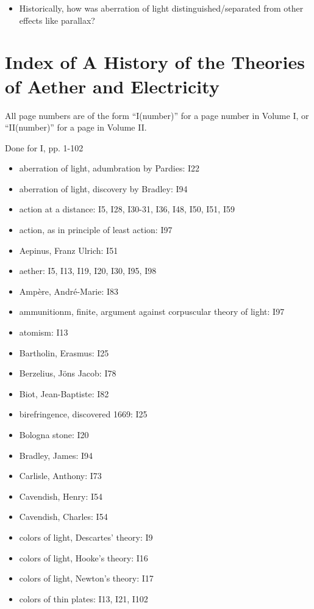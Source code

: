 \documentclass[a4paper]{article}
\theoremstyle{plain}
\theoremstyle{definition}
\begin{document}
\begin{itemize}
\item Historically, how was aberration of light
  distinguished/separated from other effects like parallax?

\end{itemize}


\section{Index of A History of the Theories of Aether and Electricity}

All page numbers are of the form ``I(number)'' for a page number in
Volume I, or ``II(number)'' for a page in Volume II.

Done for I, pp. 1-102

\begin{itemize}
\item aberration of light, adumbration by Pardies: I22
\item aberration of light, discovery by Bradley: I94
\item action at a distance: I5, I28, I30-31, I36, I48, I50, I51, I59
\item action, as in principle of least action: I97
\item Aepinus, Franz Ulrich: I51
\item aether: I5, I13, I19, I20, I30, I95, I98
\item Amp\`{e}re, Andr\'{e}-Marie: I83
\item ammunitionm, finite, argument against corpuscular theory of light: I97
\item atomism: I13
\item Bartholin, Erasmus: I25
\item Berzelius, J\"{o}ns Jacob: I78
\item Biot, Jean-Baptiste: I82
\item birefringence, discovered 1669: I25
\item Bologna stone: I20
\item Bradley, James: I94
\item Carlisle, Anthony: I73
\item Cavendish, Henry: I54
\item Cavendish, Charles: I54
\item colors of light, Descartes' theory: I9
\item colors of light, Hooke's theory: I16
\item colors of light, Newton's theory: I17
\item colors of thin plates: I13, I21, I102

\end{itemize}
\end{document}
